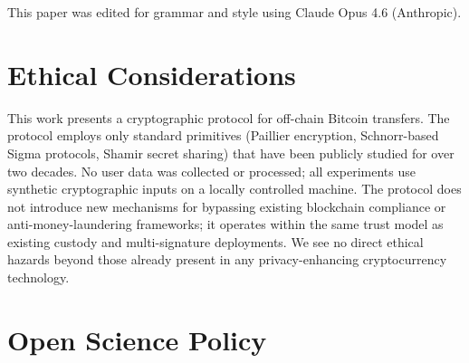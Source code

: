 \documentclass[sigconf,review,anonymous,screen]{acmart}
\begin{document}

\maketitle










\begin{acks}
This paper was edited for grammar and style using Claude Opus 4.6 (Anthropic).
\end{acks}





\section*{Ethical Considerations}
This work presents a cryptographic protocol for off-chain Bitcoin transfers.
The protocol employs only standard primitives (Paillier encryption, Schnorr-based Sigma protocols, Shamir secret sharing) that have been publicly studied for over two decades.
No user data was collected or processed; all experiments use synthetic cryptographic inputs on a locally controlled machine.
The protocol does not introduce new mechanisms for bypassing existing blockchain compliance or anti-money-laundering frameworks; it operates within the same trust model as existing custody and multi-signature deployments.
We see no direct ethical hazards beyond those already present in any privacy-enhancing cryptocurrency technology.

\section*{Open Science Policy}

\appendix



\end{document}
